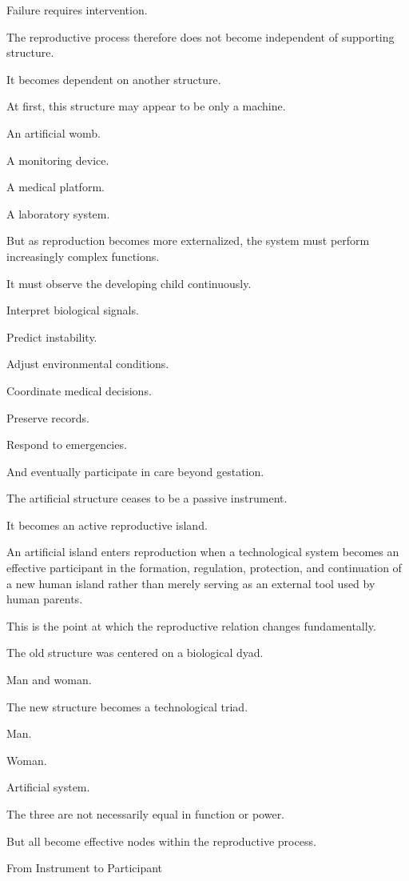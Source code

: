 Failure requires intervention.

The reproductive process therefore does not become independent of supporting structure.

It becomes dependent on another structure.

At first, this structure may appear to be only a machine.

An artificial womb.

A monitoring device.

A medical platform.

A laboratory system.

But as reproduction becomes more externalized, the system must perform increasingly complex functions.

It must observe the developing child continuously.

Interpret biological signals.

Predict instability.

Adjust environmental conditions.

Coordinate medical decisions.

Preserve records.

Respond to emergencies.

And eventually participate in care beyond gestation.

The artificial structure ceases to be a passive instrument.

It becomes an active reproductive island.

An artificial island enters reproduction when a technological system becomes an effective participant in the formation, regulation, protection, and continuation of a new human island rather than merely serving as an external tool used by human parents.

This is the point at which the reproductive relation changes fundamentally.

The old structure was centered on a biological dyad.

Man and woman.

The new structure becomes a technological triad.

Man.

Woman.

Artificial system.

The three are not necessarily equal in function or power.

But all become effective nodes within the reproductive process.

From Instrument to Participant

